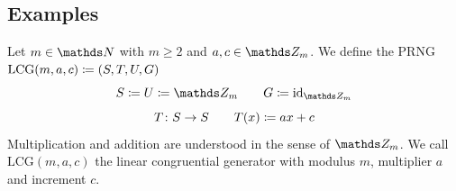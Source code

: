 \documentclass{stdlocal}
\begin{document}
  \subsection{Examples}
    \begin{definition}
      Let $m\in\setNatural$ with $m\geq 2$ and $a,c\in\setInteger_m$.
      We define the PRNG $\mathrm{LCG}(m,a,c) \coloneqq (S,T,U,G)$
      \[
        S \define U \define \setInteger_m
        \separate
        G \define \identity_{\setInteger_m}
      \]
      \[
        T\colon S\to S
        \qquad
        T(x) \coloneqq a x + c
      \]
      Multiplication and addition are understood in the sense of $\setInteger_m$.
      We call $\mathrm{LCG}(m,a,c)$ the linear congruential generator with modulus $m$, multiplier $a$ and increment $c$.
    \end{definition}

    \begin{definition}

    \end{definition}
\end{document}
